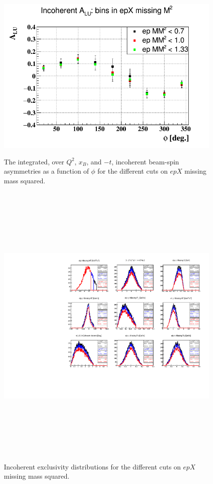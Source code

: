 \begin{enumerate}
\begin{enumerate}
   \begin{figure}[tbp]
    \centering
    \includegraphics[height=8.6cm]{fig/BSA_incoherent_epMM.png}
    \caption{ The integrated, over $Q^{2}$, $x_{B}$, and $-t$, incoherent 
    beam-spin asymmetries as a function of $\phi$ for the different cuts on 
 $epX$ missing mass squared.}
    \label{fig:BSA_incoherent_epMM}
    \end{figure}                                                                

    \begin{figure}[tbp]
    \centering
    \includegraphics[height=14.6cm]{fig/epMM2_incoh_exc_cuts.pdf}
    \caption{ Incoherent exclusivity distributions for the different cuts on 
    $epX$ missing mass squared.}
    \label{fig:epMM2_incoh_exc_cuts}
    \end{figure}                                                                  



\end{enumerate}
\end{enumerate}

